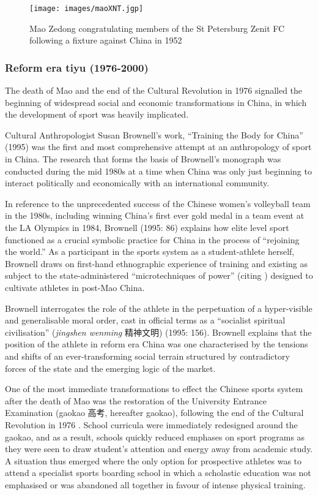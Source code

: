 {\begin{figure}[htbp]
  \texttt{[image: images/maoXNT.jgp]}
  \caption{Mao Zedong congratulating members of the St Petersburg Zenit FC following a fixture against China in 1952}
  \label{fig:maoXNT}
\end{figure}


\subsubsection{Reform era tiyu (1976-2000)}
The death of Mao and the end of the Cultural Revolution in 1976 signalled the beginning of widespread social and economic transformations in China, in which the development of sport was heavily implicated.

Cultural Anthropologist Susan Brownell’s work, ``Training the Body for China'' (1995) was the first and most comprehensive attempt at an anthropology of sport in China. The research that forms the basis of Brownell's monograph was conducted during the mid 1980s at a time when China was only just beginning to interact politically and economically with an international community.


 In reference to the unprecedented success of the Chinese women’s volleyball team in the 1980s, including winning China's first ever gold medal in a team event at the LA Olympics in 1984, Brownell (1995: 86) explains how elite level sport functioned as a crucial symbolic practice for China in the process of ``rejoining the world.''  As a participant in the sports system as a student-athlete herself, Brownell draws on first-hand ethnographic experience of training and existing as subject to the state-administered ``microtechniques of power'' (citing \cite{Foucault1977}) designed to cultivate athletes in post-Mao China.


Brownell interrogates the role of the athlete in the perpetuation of a hyper-visible and generalisable moral order, cast in official terms as a ``socialist spiritual civilisation'' (\textit{jingshen wenming} 精神文明) (1995: 156).  Brownell explains that the position of the athlete in reform era China was one characterised by the tensions and shifts of an ever-transforming social terrain structured by contradictory forces of the state and the emerging logic of the market.

One of the most immediate transformations to effect the Chinese sports system after the death of Mao was the restoration of the University Entrance Examination (gaokao 高考, hereafter gaokao), following the end of the Cultural Revolution in 1976 \citep[198]{Brownell1995}.  School curricula were immediately redesigned around the gaokao, and as a result, schools quickly reduced emphases on sport programs as they were seen to draw student’s attention and energy away from academic study.  A situation thus emerged where the only option for prospective athletes was to attend a specialist sports boarding school in which a scholastic education was not emphasised or was abandoned all together in favour of intense physical training.

}

